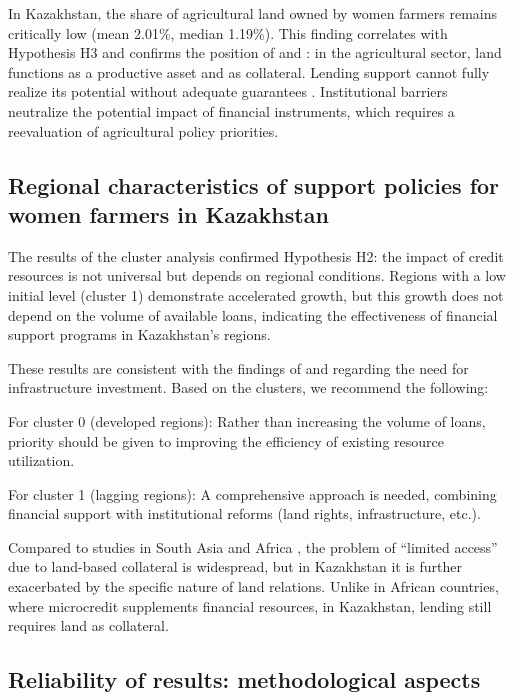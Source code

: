 \documentclass[pdflatex,sn-mathphys-ay]{sn-jnl}
\begin{document}
In Kazakhstan, the share of agricultural land owned by women farmers
remains critically low (mean 2.01\%, median 1.19\%). This finding
correlates with Hypothesis H3 and confirms the position of
\citet{ref20} and \citet{ref06}: in the agricultural sector, land
functions as a productive asset and as collateral. Lending support
cannot fully realize its potential without adequate guarantees
\citep{ref26,ref02}. Institutional barriers
neutralize the potential impact of financial instruments, which requires
a reevaluation of agricultural policy priorities.

\subsection{Regional characteristics of support policies for women farmers in Kazakhstan}

The results of the cluster analysis confirmed Hypothesis H2: the impact
of credit resources is not universal but depends on regional conditions.
Regions with a low initial level (cluster 1) demonstrate accelerated
growth, but this growth does not depend on the volume of available
loans, indicating the effectiveness of financial support programs in
Kazakhstan's regions.

These results are consistent with the findings of \citet{ref21} and \citet{ref54} regarding the need for infrastructure
investment. Based on the clusters, we recommend the following:

For cluster 0 (developed regions): Rather than increasing the volume of
loans, priority should be given to improving the efficiency of existing
resource utilization.

For cluster 1 (lagging regions): A comprehensive approach is needed,
combining financial support with institutional reforms (land rights,
infrastructure, etc.).

Compared to studies in South Asia \citep{ref44} and Africa
\citep{ref27}, the problem of ``limited access'' due
to land-based collateral is widespread, but in Kazakhstan it is further
exacerbated by the specific nature of land relations. Unlike in African
countries, where microcredit supplements financial resources, in
Kazakhstan, lending still requires land as collateral.

\subsection{Reliability of results: methodological aspects}
\end{document}
